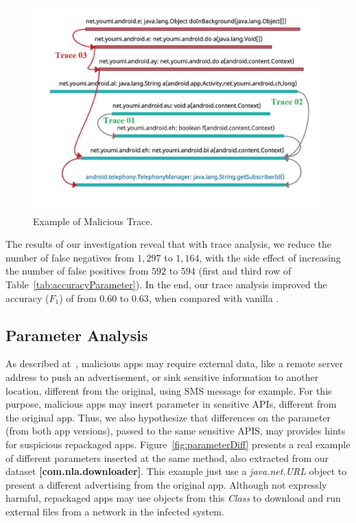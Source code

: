 \begin{figure}
\centering
\includegraphics[scale=0.28]{images/maliciousTrace_example01.pdf}
\caption{Example of Malicious Trace.}
 \label{fig:maliciousTrace}
\end{figure}


The results of our investigation reveal that with trace analysis, we reduce the number of false negatives from $1,297$ to $1,164$, with the side effect of increasing the number of false positives from $592$ to $594$ (first and third row of Table~\ref{tab:accuracyParameter}). In the end, our trace analysis improved the accuracy ($F_1$) of \mas from $0.60$ to $0.63$, when compared with vanilla \mas.


\subsection{Parameter Analysis}

As described at~\cite{le2018towards}, malicious apps may require external data, like a remote server address to push an advertisement, or sink sensitive information to another location, different from the original, using SMS message for example. For this purpose, malicious apps may insert parameter in sensitive APIs, different from the original app. Thus, we also hypothesize that differences on the parameter (from both app versions), passed to the same sensitive APIS, may provides hints for suspicious repackaged apps. Figure~\ref{fig:parameterDiff} presents a real example of different parameters inserted at the same method, also extracted from our dataset \textbf{[com.nla.downloader]}. This example just use a \textit{java.net.URL} object to present a different advertising from the original app. Although not expressly harmful, repackaged apps may use objects from this \textit{Class} to download and run external files from a network in the infected system\cite{DBLP:journals/compsec/ObaidatSPP22}.

